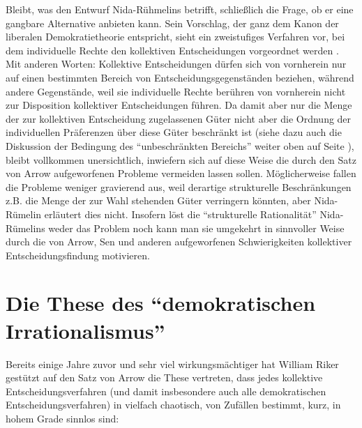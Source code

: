Bleibt, was den Entwurf Nida-Rühmelins betrifft, schließlich die Frage, ob er
eine gangbare Alternative anbieten kann. Sein Vorschlag, der ganz dem Kanon der
liberalen Demokratietheorie entspricht, sieht ein zweistufiges Verfahren vor, bei
dem individuelle Rechte den kollektiven Entscheidungen vorgeordnet werden
\cite[S. 196ff.]{nida-ruemelin:1991}. Mit anderen Worten: Kollektive
Entscheidungen dürfen sich von vornherein nur auf einen bestimmten Bereich von
Entscheidungsgegenständen beziehen, während andere Gegenstände, weil sie
individuelle Rechte berühren von vornherein nicht zur Disposition kollektiver
Entscheidungen führen.  Da damit aber nur die Menge der zur kollektiven
Entscheidung zugelassenen Güter nicht aber die Ordnung der individuellen
Präferenzen über diese Güter beschränkt ist (siehe dazu auch die Diskussion der
Bedingung des "`unbeschränkten Bereichs"' weiter oben auf Seite
\pageref{DiskussionUnbeschraenkterBereich}), bleibt vollkommen unersichtlich,
inwiefern sich auf diese Weise die durch den Satz von Arrow aufgeworfenen
Probleme vermeiden lassen sollen. Möglicherweise fallen die Probleme weniger
gravierend aus, weil derartige strukturelle Beschränkungen z.B. die Menge der zur
Wahl stehenden Güter verringern könnten, aber Nida-Rümelin erläutert dies nicht.
Insofern löst die "`strukturelle Rationalität"' Nida-Rümelins weder das Problem
noch kann man sie umgekehrt in sinnvoller Weise durch die von Arrow, Sen und
anderen aufgeworfenen Schwierigkeiten kollektiver Entscheidungsfindung
motivieren.


\section{Die These des "`demokratischen Irrationalismus"'}

Bereits einige Jahre zuvor und sehr viel wirkungsmächtiger hat William Riker
gestützt auf den Satz von Arrow die These vertreten, dass jedes kollektive
Entscheidungsverfahren (und damit insbesondere auch alle demokratischen
Entscheidungsverfahren) in vielfach chaotisch, von Zufällen bestimmt, kurz, in
hohem Grade sinnlos sind:

